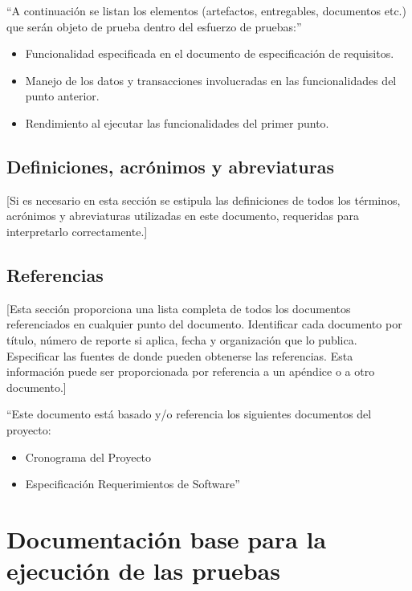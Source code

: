 \documentclass[12pt,letterpaper]{article}
\begin{document}
``A continuación se listan los elementos (artefactos, entregables, documentos etc.) que serán objeto de prueba dentro del esfuerzo de pruebas:''

\begin{itemize}
  \item Funcionalidad especificada en el documento de especificación de requisitos.
  \item Manejo de los datos y transacciones involucradas en las funcionalidades del punto anterior.
  \item Rendimiento al ejecutar las funcionalidades del primer punto.
\end{itemize}

\subsection{Definiciones, acrónimos y abreviaturas}

[Si es necesario en esta sección se estipula las definiciones de todos los términos, acrónimos y abreviaturas utilizadas en este documento, requeridas para interpretarlo correctamente.]

\subsection{Referencias}

[Esta sección proporciona una lista completa de todos los documentos referenciados en cualquier punto del documento. Identificar cada documento por título, número de reporte si aplica, fecha y organización que lo publica. Especificar las fuentes de donde pueden obtenerse las referencias. Esta información puede ser proporcionada por referencia a un apéndice o a otro documento.]

``Este documento está basado y/o referencia los siguientes documentos del proyecto:

\begin{itemize}
  \item Cronograma del Proyecto
  \item Especificación Requerimientos de Software''
\end{itemize}

\section{Documentación base para la ejecución de las pruebas}
\end{document}
